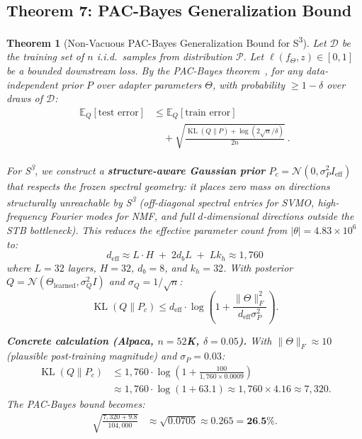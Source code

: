 \documentclass{scpe}
\newtheorem{theorem}{Theorem}[section]
\newcommand{\KL}{\operatorname{KL}}
\begin{document}
\subsection{Theorem 7: PAC-Bayes Generalization Bound}

\begin{theorem}[Non-Vacuous PAC-Bayes Generalization Bound for S\textsuperscript{3}]
\label{thm:pacbayes}
Let $\mathcal{D}$ be the training set of $n$ i.i.d.\ samples from distribution $\mathcal{P}$. Let $\ell(f_\Theta, z) \in [0,1]$ be a bounded downstream loss. By the PAC-Bayes theorem~\cite{mcallester1999pac,catoni2007pac,alquier2023pac}, for any data-independent prior $P$ over adapter parameters $\Theta$, with probability $\geq 1-\delta$ over draws of $\mathcal{D}$:
\begin{align}
\mathbb{E}_Q[\text{test error}] &\leq \mathbb{E}_Q[\text{train error}] \label{eq:pacbayes-bound} \\
&\quad + \sqrt{\frac{\KL(Q\|P) + \log(2\sqrt{n}/\delta)}{2n}} \ .
\end{align}

For S\textsuperscript{3}, we construct a \textbf{structure-aware Gaussian prior} $P_c = \mathcal{N}(0, \sigma_P^2 I_{\text{eff}})$ that respects the frozen spectral geometry: it places zero mass on directions structurally unreachable by S\textsuperscript{3} (off-diagonal spectral entries for SVMO, high-frequency Fourier modes for NMF, and full $d$-dimensional directions outside the STB bottleneck). This reduces the effective parameter count from $|\theta| = 4.83\times 10^6$ to:
\begin{equation}
\boxed{
d_{\text{eff}} \approx L \cdot H \;+\; 2d_b L \;+\; L k_h \approx 1{,}760
}
\end{equation}
where $L=32$ layers, $H=32$, $d_b=8$, and $k_h=32$. With posterior $Q = \mathcal{N}(\Theta_{\text{learned}}, \sigma_Q^2 I)$ and $\sigma_Q = 1/\sqrt{n}$:
\begin{equation}
\KL(Q\|P_c) \leq d_{\text{eff}} \cdot \log\!\left(1 + \frac{\|\Theta\|_F^2}{d_{\text{eff}} \sigma_P^2}\right).
\end{equation}

\textbf{Concrete calculation (Alpaca, $n=52$K, $\delta=0.05$).}
With $\|\Theta\|_F \approx 10$ (plausible post-training magnitude) and $\sigma_P = 0.03$:
\begin{align}
\KL(Q\|P_c) &\leq 1{,}760 \cdot \log\!\left(1 + \frac{100}{1{,}760 \times 0.0009}\right) \nonumber\\
&\approx 1{,}760 \cdot \log(1 + 63.1) \approx 1{,}760 \times 4.16 \approx 7{,}320.
\end{align}
The PAC-Bayes bound becomes:
\begin{align}
\sqrt{\frac{7{,}320 + 9.8}{104{,}000}}
&\approx \sqrt{0.0705} \approx 0.265 = \textbf{26.5\%}.
\end{align}


\end{theorem}
\end{document}
